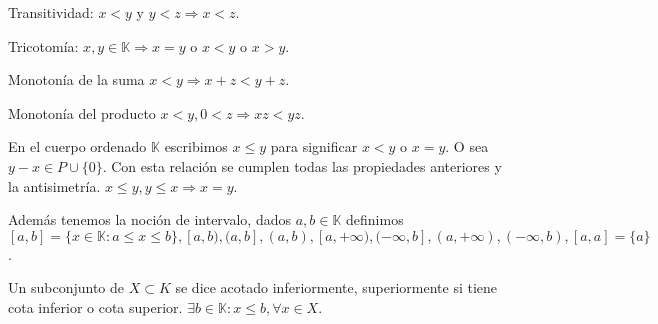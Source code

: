 \begin{prop}
    Transitividad: $x<y$ y $y<z \Rightarrow x<z$.
\end{prop}

\begin{prop}
    Tricotomía: $x,y \in \mathbb{K} \Rightarrow x=y$ o $x<y$ o $x>y$.
\end{prop}

\begin{prop}
    Monotonía de la suma $x<y \Rightarrow x+z<y+z$.
\end{prop}

\begin{prop}
    Monotonía del producto $x<y, 0<z \Rightarrow xz <yz$.
\end{prop}

En el cuerpo ordenado $\mathbb{K}$ escribimos $x \leq y$ para significar $x<y$ o $x=y$. O sea $y-x \in P \cup \{0\}$. Con esta relación se cumplen todas las propiedades anteriores y la antisimetría. $x \leq y, y \leq x \Rightarrow x = y$.

Además tenemos la noción de intervalo, dados $a,b \in \mathbb{K}$ definimos $[a,b ] = \{ x \in \mathbb{K} : a \leq x \leq b \}, [a, b), (a, b], (a,b), [a, +\infty), (-\infty, b], (a, +\infty), (-\infty, b), [a, a] = \{a\}$.

Un subconjunto de $X \subset K$ se dice acotado inferiormente, superiormente si tiene cota inferior o cota superior. $\exists b \in \mathbb{K}: x \leq b, \forall x \in X$.

